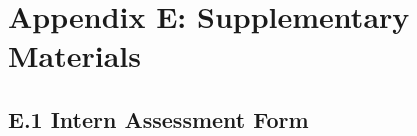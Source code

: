 \documentclass[
  12pt,
  a4paperpaper,
]{report}
\begin{document}
\clearpage

\section*{Appendix E: Supplementary Materials}

\subsection{E.1 Intern Assessment Form}
\thispagestyle{fancy}

\newcommand{\scoredrow}[1]{%
  \noindent\begin{tabular}{|p{\dimexpr\textwidth-5cm-12\tabcolsep-7\arrayrulewidth\relax}|>{\centering\arraybackslash}p{1cm}|>{\centering\arraybackslash}p{1cm}|>{\centering\arraybackslash}p{1cm}|>{\centering\arraybackslash}p{1cm}|>{\centering\arraybackslash}p{1cm}|}
  \hline
  #1 & 1 & 2 & 3 & 4 & \textbf{\fbox{\fbox{5}}} \\
  \hline
  \end{tabular}\par\nointerlineskip\vspace{-0.4pt}%
}

\vspace*{0.2cm}
\end{document}
